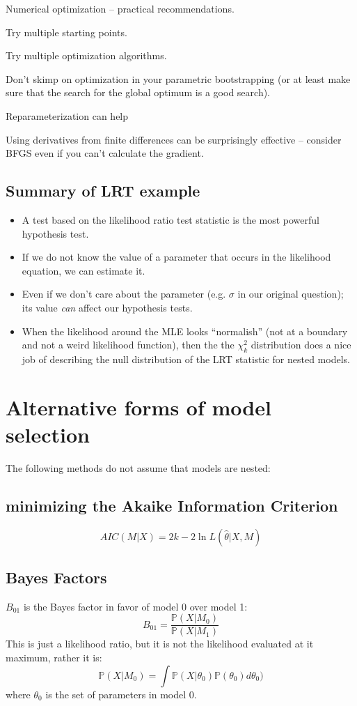 \documentclass[landscape]{foils}
\renewcommand{\Pr}{\mathbb{P}}
\begin{document}
\myNewSlide
\Large
Numerical optimization -- practical recommendations.
\begin{compactenum}
  \item Try multiple starting points.
  \item Try multiple optimization algorithms.
  \item Don't skimp on optimization in your parametric bootstrapping (or at least make sure that the search for the global optimum is a good search).
  \item Reparameterization can help
  \item Using derivatives from finite differences can be surprisingly effective -- consider BFGS even if you can't calculate the gradient.
\end{compactenum}

\myNewSlide
\subsection*{Summary of LRT example}
\normalsize
\begin{itemize}
  \item A test based on the likelihood ratio test statistic is the most powerful hypothesis test.
  \item If we do not know the value of a parameter that occurs in the likelihood equation, we can estimate it.
  \item Even if we don't care about the parameter (e.g. $\sigma$ in our original question); its value {\em can} affect our hypothesis tests. 
  \item When the likelihood around the MLE looks ``normalish'' (not at a boundary and not a weird likelihood function), then the the $\chi_k^2$ distribution does a nice job of describing the null distribution of the LRT statistic for nested models.
\end{itemize}
\myNewSlide
\section*{Alternative forms of model selection}
The following methods do not assume that models are nested:
\subsection*{minimizing the Akaike Information Criterion}
  $$AIC(M|X) = 2k - 2 \ln L(\hat\theta | X, M)$$

\subsection*{Bayes Factors}
$B_{01}$ is the Bayes factor in favor of model 0 over model 1:
$$B_{01} = \frac{\Pr(X|M_0)}{\Pr(X|M_1)}$$
This is just a likelihood ratio, but it is not the likelihood evaluated at it maximum, rather it is:
\begin{equation}
  \Pr(X|M_0) = \int \Pr(X|\theta_0)\Pr(\theta_0) d\theta_0) \label{margLike}
\end{equation}
where $\theta_0$ is the set of parameters in model 0.
\end{document}
